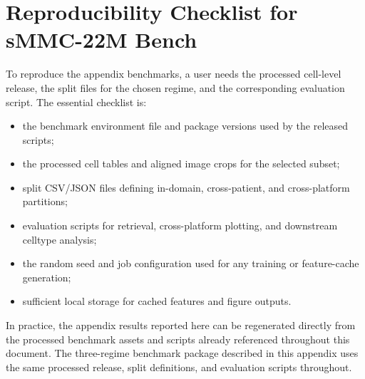 \documentclass[sigconf,review]{acmart}
\newcommand{\dataset}{sMMC-22M\xspace}
\begin{document}
\section{Reproducibility Checklist for \dataset Bench}
\label{sec:reproducibility_checklist}
\noindent
To reproduce the appendix benchmarks, a user needs the processed cell-level release, the split files for the chosen regime, and the corresponding evaluation script. The essential checklist is:
\begin{itemize}
    \item the benchmark environment file and package versions used by the released scripts;
    \item the processed cell tables and aligned image crops for the selected subset;
    \item split CSV/JSON files defining in-domain, cross-patient, and cross-platform partitions;
    \item evaluation scripts for retrieval, cross-platform plotting, and downstream celltype analysis;
    \item the random seed and job configuration used for any training or feature-cache generation;
    \item sufficient local storage for cached features and figure outputs.
\end{itemize}

In practice, the appendix results reported here can be regenerated directly from the processed benchmark assets and scripts already referenced throughout this document. The three-regime benchmark package described in this appendix uses the same processed release, split definitions, and evaluation scripts throughout.
\end{document}

